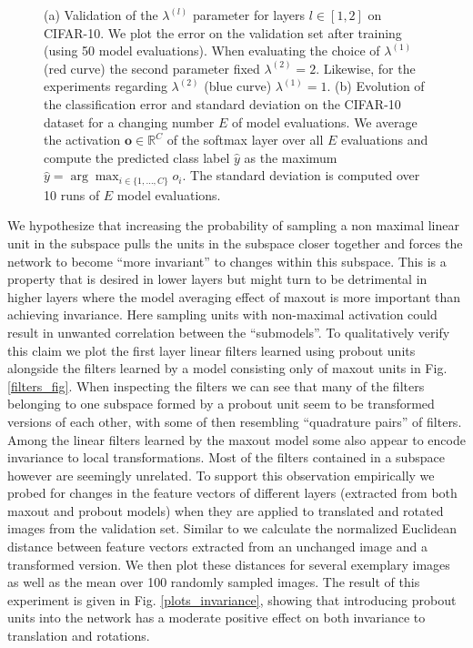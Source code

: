 \documentclass{article} \pdfoutput=1
\begin{document}
\begin{figure}[h]
\begin{subfigure}[b]{0.5\columnwidth}
  \caption{}
  \label{model_average_plot}
\end{subfigure}
\caption{(a) Validation of the $\lambda^{(l)}$ parameter for layers $l
  \in [1, 2]$ on CIFAR-10. We plot the error on the validation set
  after training (using 50 model evaluations). When evaluating the
  choice of $\lambda^{(1)}$ (red curve) the second parameter fixed
  $\lambda^{(2)} = 2$. Likewise, for the experiments regarding
  $\lambda^{(2)}$ (blue curve) $\lambda^{(1)} = 1$.  (b) Evolution of
  the classification error and standard deviation on the CIFAR-10
  dataset for a changing number $E$ of model evaluations. We average
  the activation $\mathbf{o} \in \mathbb{R}^{C}$ of the softmax layer
  over all $E$ evaluations and compute the predicted class label
  $\hat{y}$ as the maximum $\hat{y} = \arg \max_{i \in \{ 1, \dots, C
    \}} o_i$. The standard deviation is computed over 10 runs of $E$
  model evaluations.}
  \label{two_plots}
\end{figure}

We hypothesize that increasing the probability of sampling a non
maximal linear unit in the subspace pulls the units in the subspace
closer together and forces the network to become ``more invariant'' to
changes within this subspace. This is a property that is desired in
lower layers but might turn to be detrimental in higher layers where
the model averaging effect of maxout is more important than achieving
invariance. Here sampling units with non-maximal activation could
result in unwanted correlation between the ``submodels''. To
qualitatively verify this claim we plot the first layer linear filters
learned using probout units alongside the filters learned by a model
consisting only of maxout units in Fig. \ref{filters_fig}.  When
inspecting the filters we can see that many of the filters belonging
to one subspace formed by a probout unit seem to be transformed
versions of each other, with  some of then resembling ``quadrature pairs''
of filters. Among the linear filters learned by the maxout model
some also appear to encode invariance to local transformations. Most
of the filters contained in a subspace however are seemingly
unrelated.
To support this observation empirically we probed for changes in the
feature vectors of different layers (extracted from both maxout and probout models) when
they are applied to translated and rotated images from the validation set. Similar to
\cite{Koray_CVPR2009,Zeiler2013} we calculate the normalized Euclidean distance between feature
vectors extracted from an unchanged image and a transformed
version. We then plot these distances for several exemplary images as
well as the mean over 100 randomly sampled images. The result of this
experiment is given in Fig. \ref{plots_invariance}, showing that
introducing probout units into the network has a moderate positive effect on both
invariance to translation and rotations.
\end{document}
